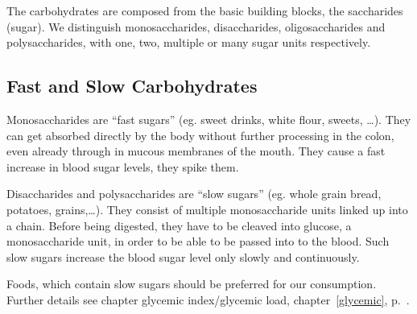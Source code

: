\documentclass[../main.tex]{subfiles}
\begin{document}
The carbohydrates are composed from the basic building blocks, the saccharides (sugar).
We distinguish monosaccharides, disaccharides, oligosaccharides and polysaccharides, with one, two, multiple or many sugar units respectively.

\subsection{Fast and Slow Carbohydrates}



Monosaccharides are ``fast sugars'' (eg. sweet drinks, white flour, sweets, \ldots).
They can get absorbed directly by the body without further processing in the colon, even already through in mucous membranes of the mouth.
They cause a fast increase in blood sugar levels, they spike them.

Disaccharides and polysaccharides are ``slow sugars'' (eg. whole grain bread, potatoes, grains,\ldots).
They consist of multiple monosaccharide units linked up into a chain.
Before being digested, they have to be cleaved into glucose,
a monosaccharide unit, in order to be able to be passed into to the blood.
Such slow sugars increase the blood sugar level only slowly and continuously.

Foods, which contain slow sugars should be preferred for our consumption.
Further details see chapter glycemic index/glycemic load, chapter~\ref{glycemic}, p.~\pageref{glycemic}.
\end{document}
